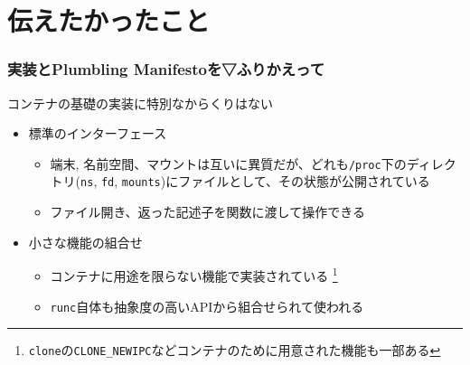 \documentclass[unicode, 14pt, aspectratio=169]{beamer}
\begin{document}
\section{伝えたかったこと}
\begin{frame}[t]
  \frametitle{実装とPlumbling Manifestoを▽ふりかえって}
  \large
  コンテナの基礎の実装に特別なからくりはない
  \normalsize
  \begin{itemize}[leftmargin=0.8cm,label=$\circ$]
  \item 標準のインターフェース
    \begin{itemize}[leftmargin=0.8cm,label=$\circ$]
    \item 端末, 名前空間、マウントは互いに異質だが、どれも\texttt{/proc}下のディレクトリ(\texttt{ns}, \texttt{fd}, \texttt{mounts})にファイルとして、その状態が公開されている
    \item ファイル開き、返った記述子を関数に渡して操作できる
    \end{itemize}
  \item 小さな機能の組合せ
    \begin{itemize}[leftmargin=0.8cm,label=$\circ$]
      \item コンテナに用途を限らない機能で実装されている
        \footnote{\texttt{clone}の\texttt{CLONE\_NEWIPC}などコンテナのために用意された機能も一部ある\supercite{clone}}
      \item \texttt{runc}自体も抽象度の高いAPIから組合せられて使われる
    \end{itemize}
  \end{itemize}  
\end{frame}
\end{document}
